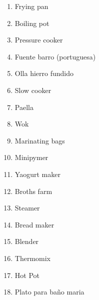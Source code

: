 
\begin{enumerate}
  \item Frying pan
  \item Boiling pot
  \item Pressure cooker
  \item Fuente barro (portuguesa)
  \item Olla hierro fundido
  \item Slow cooker
  \item Paella
  \item Wok
  \item Marinating bags
  \item Minipymer
  \item Yaogurt maker
  \item Broths farm
  \item Steamer
  \item Bread maker
  \item Blender
  \item Thermomix
  \item Hot Pot
  \item Plato para baño maria
\end{enumerate}
